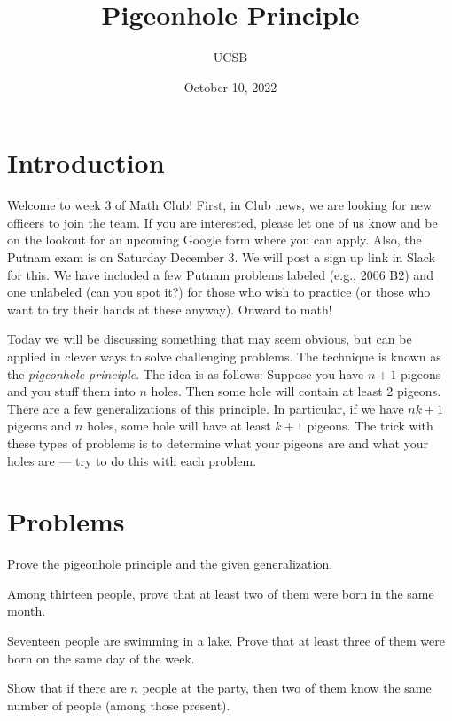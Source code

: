 \documentclass{article}
\title{Pigeonhole Principle}
\author{UCSB}
\date{October 10, 2022}
\begin{document}
\section{Introduction}

Welcome to week 3 of Math Club!
First, in Club news, we are looking for new officers to join the team.
If you are interested, please let one of us know and be on the lookout for an upcoming Google form where you can apply.
Also, the Putnam exam is on Saturday December 3.
We will post a sign up link in Slack for this.
We have included a few Putnam problems labeled (e.g., 2006 B2) and one unlabeled (can you spot it?) for those who wish to practice (or those who want to try their hands at these anyway).
Onward to math!

Today we will be discussing something that may seem obvious, but can be applied in clever ways to solve challenging problems.
The technique is known as the \textit{pigeonhole principle}.
The idea is as follows: Suppose you have \(n+1\) pigeons and you stuff them into \(n\) holes.
Then some hole will contain at least 2 pigeons.
There are a few generalizations of this principle.
In particular, if we have \(nk+1\) pigeons and \(n\) holes, some hole will have at least \(k+1\) pigeons.
The trick with these types of problems is to determine what your pigeons are and what your holes are --- try to do this with each problem.

\section{Problems}

\begin{exercise}
    Prove the pigeonhole principle and the given generalization.
\end{exercise}

\begin{exercise}
    Among thirteen people, prove that at least two of them were born in the same month.
\end{exercise}

\begin{exercise}
    Seventeen people are swimming in a lake.
    Prove that at least three of them were born on the same day of the week.
\end{exercise}

\begin{exercise}
    Show that if there are $n$ people at the party, then two of them know the same number of people (among those present).
\end{exercise}
\end{document}
